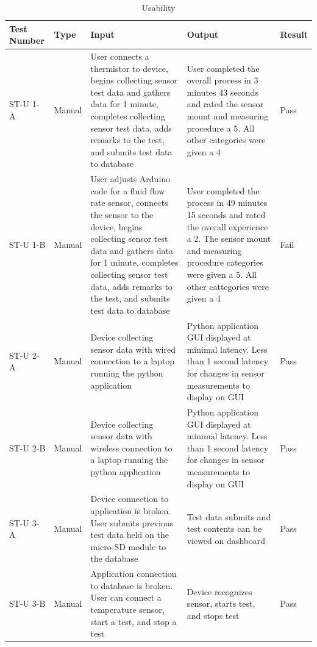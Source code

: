 \documentclass[12pt, titlepage]{article}
\begin{document}
\begin{table}[h!]
  \begin{tabular}{| p{} | p{}| p{}| p{}| p{}|}
    \hline
    \rowcolor[gray]{0.9}
    Test Number & Type & Input & Output & Result\\
    \hline
    ST-U 1-A & Manual & User connects a thermistor to device, begins collecting sensor test data and gathers data for 1 minute, completes collecting sensor test data, adds remarks to the test, and submits test data to database & User completed the overall process in 3 minutes 43 seconds and rated the sensor mount and measuring procedure a 5. All other categories were given a 4 & Pass \\
    \hline
    ST-U 1-B & Manual & User adjusts Arduino code for a fluid flow rate sensor, connects the sensor to the device, begins collecting sensor test data and gathers data for 1 minute, completes collecting sensor test data, adds remarks to the test, and submits test data to database & User completed the process in 49 minutes 15 seconds and rated the overall experience a 2. The sensor mount and measuring procedure categories were given a 5. All other cattegories were given a 4 & Fail \\
    \hline
    ST-U 2-A & Manual & Device collecting sensor data with wired connection to a laptop running the python application & Python application GUI displayed at minimal latency. Less than 1 second latency for changes in sensor measurements to display on GUI & Pass \\
    \hline
    ST-U 2-B & Manual & Device collecting sensor data with wireless connection to a laptop running the python application & Python application GUI displayed at minimal latency. Less than 1 second latency for changes in sensor measurements to display on GUI & Pass \\
    \hline
    ST-U 3-A & Manual & Device connection to application is broken. User submits previous test data held on the micro-SD module to the database & Test data submits and test contents can be viewed on dashboard & Pass \\
    \hline
    ST-U 3-B & Manual & Application connection to database is broken. User can connect a temperature sensor, start a test, and stop a test & Device recognizes sensor, starts test, and stops test & Pass  \\
    \hline
  \end{tabular}
  \caption{Usability}
  \end{table}
\end{document}
